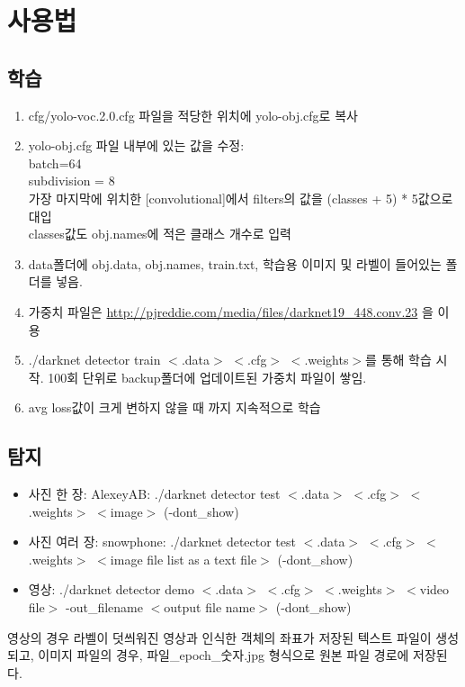 \documentclass[a4paper,12pt]{article}
\begin{document}
\section{사용법}
\subsection{학습}
\begin{enumerate}
	\item cfg/yolo-voc.2.0.cfg 파일을 적당한 위치에 yolo-obj.cfg로 복사
	\item yolo-obj.cfg 파일 내부에 있는 값을 수정: 
		\\batch=64
		\\subdivision = 8
		\\가장 마지막에 위치한 [convolutional]에서 filters의 값을 (classes + 5) * 5값으로 대입
		\\classes값도 obj.names에 적은 클래스 개수로 입력
	\item data폴더에 obj.data, obj.names, train.txt, 학습용 이미지 및 라벨이 들어있는 폴더를 넣음.
	\item 가중치 파일은 \url{http://pjreddie.com/media/files/darknet19\_448.conv.23} 을 이용
	\item ./darknet detector train $<$.data$>$ $<$.cfg$>$ $<$.weights$>$를 통해 학습 시작. 100회 단위로 backup폴더에 업데이트된 가중치 파일이 쌓임.
	\item avg loss값이 크게 변하지 않을 때 까지 지속적으로 학습
\end{enumerate}

\subsection{탐지}
\begin{itemize}
	\item 사진 한 장: AlexeyAB: ./darknet detector test $<$.data$>$ $<$.cfg$>$ $<$.weights$>$ $<$image$>$ (-dont\_show)
	\item 사진 여러 장: snowphone: ./darknet detector test $<$.data$>$ $<$.cfg$>$ $<$.weights$>$ $<$image file list as a text file$>$ (-dont\_show)
	\item 영상: ./darknet detector demo $<$.data$>$ $<$.cfg$>$ $<$.weights$>$ $<$video file$>$ -out\_filename $<$output file name$>$ (-dont\_show)
\end{itemize}

영상의 경우 라벨이 덧씌워진 영상과 인식한 객체의 좌표가 저장된 텍스트 파일이 생성되고, 이미지 파일의 경우, 파일\_epoch\_숫자.jpg 형식으로 원본 파일 경로에 저장된다.
\end{document}
